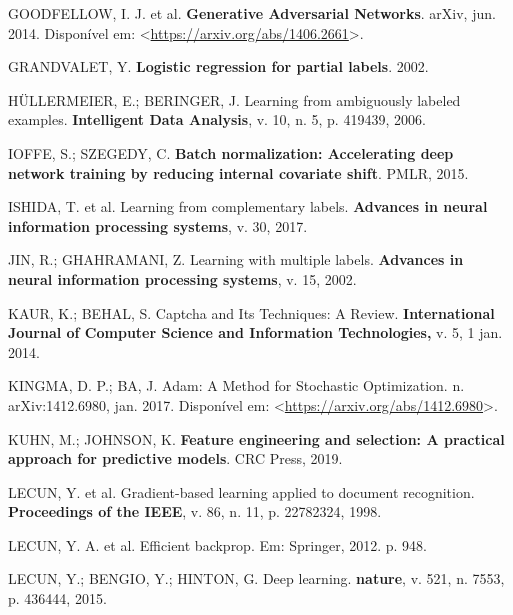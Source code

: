 \documentclass[12pt,twoside,brazilian]{book}
\newlength{\cslhangindent}
\newlength{\cslentryspacingunit} %
\newenvironment{CSLReferences}[2] %
 {%
  \setlength{\parindent}{0pt}
  \ifodd #1
  \let\oldpar\par
  \def\par{\hangindent=\cslhangindent\oldpar}
  \fi
  \setlength{\parskip}{#2\cslentryspacingunit}
 }%
 {}
\begin{document}
\begin{CSLReferences}{0}{1}
\leavevmode{}%
GOODFELLOW, I. J. et al. \textbf{Generative {Adversarial Networks}}.
{arXiv}, jun. 2014. Disponível em:
\textless{}\url{https://arxiv.org/abs/1406.2661}\textgreater.

\leavevmode{}%
GRANDVALET, Y. \textbf{Logistic regression for partial labels}. 2002.

\leavevmode{}%
HÜLLERMEIER, E.; BERINGER, J. Learning from ambiguously labeled
examples. \textbf{Intelligent Data Analysis}, v. 10, n. 5, p. 419439,
2006.

\leavevmode{}%
IOFFE, S.; SZEGEDY, C. \textbf{Batch normalization: Accelerating deep
network training by reducing internal covariate shift}. PMLR, 2015.

\leavevmode{}%
ISHIDA, T. et al. Learning from complementary labels. \textbf{Advances
in neural information processing systems}, v. 30, 2017.

\leavevmode{}%
JIN, R.; GHAHRAMANI, Z. Learning with multiple labels. \textbf{Advances
in neural information processing systems}, v. 15, 2002.

\leavevmode{}%
KAUR, K.; BEHAL, S. Captcha and Its Techniques: A Review.
\textbf{International Journal of Computer Science and Information
Technologies,} v. 5, 1 jan. 2014.

\leavevmode{}%
KINGMA, D. P.; BA, J. Adam: {A Method} for {Stochastic Optimization}. n.
arXiv:1412.6980, jan. 2017. Disponível em:
\textless{}\url{https://arxiv.org/abs/1412.6980}\textgreater.

\leavevmode{}%
KUHN, M.; JOHNSON, K. \textbf{Feature engineering and selection: A
practical approach for predictive models}. CRC Press, 2019.

\leavevmode{}%
LECUN, Y. et al. Gradient-based learning applied to document
recognition. \textbf{Proceedings of the IEEE}, v. 86, n. 11, p.
22782324, 1998.

\leavevmode{}%
LECUN, Y. A. et al. Efficient backprop. Em: Springer, 2012. p. 948.

\leavevmode{}%
LECUN, Y.; BENGIO, Y.; HINTON, G. Deep learning. \textbf{nature}, v.
521, n. 7553, p. 436444, 2015.


\end{CSLReferences}
\end{document}
